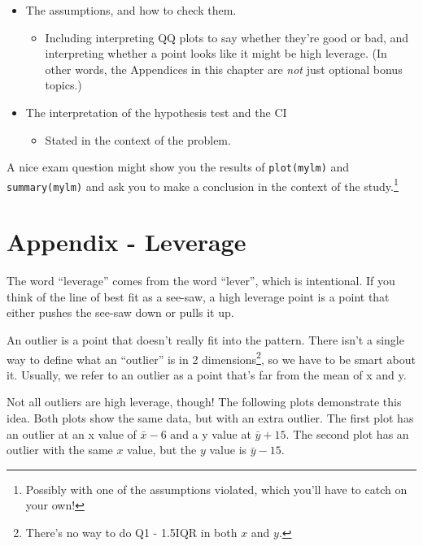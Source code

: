 \documentclass[
  letterpaper,
  DIV=11,
  numbers=noendperiod]{scrreprt}
\providecommand{\tightlist}{%
  \setlength{\itemsep}{0pt}\setlength{\parskip}{0pt}}\usepackage{longtable,booktabs,array}
\begin{document}
\begin{itemize}
\tightlist
\item
  The assumptions, and how to check them.

  \begin{itemize}
  \tightlist
  \item
    Including interpreting QQ plots to say whether they're good or bad,
    and interpreting whether a point looks like it might be high
    leverage. (In other words, the Appendices in this chapter are
    \emph{not} just optional bonus topics.)
  \end{itemize}
\item
  The interpretation of the hypothesis test and the CI

  \begin{itemize}
  \tightlist
  \item
    Stated in the context of the problem.
  \end{itemize}
\end{itemize}

A nice exam question might show you the results of \texttt{plot(mylm)}
and \texttt{summary(mylm)} and ask you to make a conclusion in the
context of the study.\footnote{Possibly with one of the assumptions
  violated, which you'll have to catch on your own!}

\hypertarget{appendix---leverage}{%
\section{Appendix - Leverage}\label{appendix---leverage}}

The word ``leverage'' comes from the word ``lever'', which is
intentional. If you think of the line of best fit as a see-saw, a high
leverage point is a point that either pushes the see-saw down or pulls
it up.

An outlier is a point that doesn't really fit into the pattern. There
isn't a single way to define what an ``outlier'' is in 2
dimensions\footnote{There's no way to do Q1 - 1.5IQR in both \(x\) and
  \(y\).}, so we have to be smart about it. Usually, we refer to an
outlier as a point that's far from the mean of x and y.

Not all outliers are high leverage, though! The following plots
demonstrate this idea. Both plots show the same data, but with an extra
outlier. The first plot has an outlier at an x value of \(\bar x - 6\)
and a y value at \(\bar y + 15\). The second plot has an outlier with
the same \(x\) value, but the \(y\) value is \(\bar y - 15\).
\end{document}
